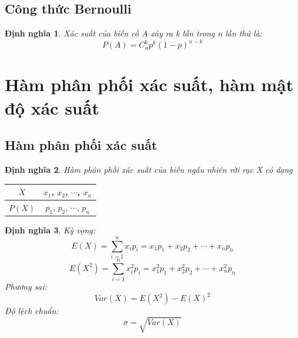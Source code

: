 \documentclass[12pt]{article}
\newtheorem{thm}{Định nghĩa}
\begin{document}
\subsection{Công thức Bernoulli}

\begin{thm}
Xác suất của biến cố A xảy ra k lần trong n lần thử là:
\begin{equation}
P(A) = C_n^k p^k (1-p)^{n-k}
\end{equation}
\end{thm}

\section{Hàm phân phối xác suất, hàm mật độ xác suất}
\subsection{Hàm phân phối xác suất}
\begin{thm}
Hàm phân phối xác suất của biến ngẫu nhiên rời rạc X có dạng
\end{thm}
\begin{tabular}{|c|c|}
    \hline
    $X$ & $x_1$, $x_2$, $\cdots$, $x_n$ \\
    \hline
    $P(X)$ & $p_1$, $p_2$, $\cdots$, $p_n$ \\
    \hline
  \end{tabular}
\begin{thm}
    Kỳ vọng:
    \begin{equation}
    E(X) = \sum_{i=1}^n x_ip_i = x_1p_1 + x_2p_2 + \cdots + x_np_n
    \end{equation}
    \begin{equation}
    E(X^2) = \sum_{i=1}^n x_i^2p_i = x_1^2p_1 + x_2^2p_2 + \cdots + x_n^2p_n
    \end{equation}
    Phương sai:
    \begin{equation}
    Var(X) = E(X^2) - E(X)^2
    \end{equation}
    Độ lệch chuẩn:
    \begin{equation}
    \sigma = \sqrt{Var(X)}
    \end{equation}
\end{thm}
\end{document}

